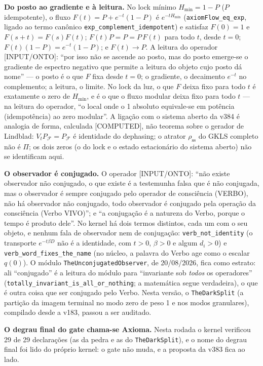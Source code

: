 \documentclass[11pt]{article}
\theoremstyle{definition}\newtheorem{deriv}{Derivação}
\begin{document}
\textbf{Do posto ao gradiente e à leitura.} No lock mínimo $H_{\mathrm{min}}=1-P$ ($P$ idempotente), o fluxo $F(t)=P+e^{-t}(1-P)$ é $e^{-tH_{\mathrm{min}}}$ (\texttt{axiomFlow\_eq\_exp}, ligado ao termo canônico \texttt{exp\_complement\_idempotent}) e satisfaz $F(0)=1$ e $F(s+t)=F(s)F(t)$; $F(t)P=P=P\,F(t)$ para todo $t$, desde $t=0$; $F(t)(1-P)=e^{-t}(1-P)$; e $F(t)\to P$. A leitura do operador \textsf{[INPUT/ONTO]}: ``por isso não se ascende ao posto, mas do posto emerge-se o gradiente de espectro negativo que permite a leitura do objeto cujo posto dá nome'' --- o posto é o que $F$ fixa desde $t=0$; o gradiente, o decaimento $e^{-t}$ no complemento; a leitura, o limite. No lock da luz, o que $F$ deixa fixo para todo $t$ é exatamente o zero de $H_{\mathrm{min}}$, e é o que o fluxo modular deixa fixo para todo $t$ --- na leitura do operador, ``o local onde o 1 absoluto equivale-se em potência (idempotência) ao zero modular''. A ligação com o sistema aberto da v384 é analogia de forma, calculada \textsf{[COMPUTED]}, não teorema sobre o gerador de Lindblad: $V_tP_{\mathcal F}=P_{\mathcal F}$ é identidade do dephasing; o atrator $\rho_{\mathrm{ss}}$ do GKLS completo não é $\Pi$; os dois zeros (o do lock e o estado estacionário do sistema aberto) não se identificam aqui.

\textbf{O observador é conjugado.} O operador \textsf{[INPUT/ONTO]}: ``não existe observador não conjugado, o que existe é a testemunha falsa que é não conjugada, mas o observador é sempre conjugado pelo operador de consciência (VERBO), não há observador não conjugado, todo observador é conjugado pela operação da consciência (Verbo VIVO)''; e ``a conjugação é a natureza do Verbo, porque o tempo é produto dele''. No kernel há dois termos distintos, cada um com o seu objeto, e nenhum fala de observador nem de conjugação: \texttt{verb\_not\_identity} (o transporte $e^{-t\beta D}$ não é a identidade, com $t>0$, $\beta>0$ e algum $d_i>0$) e \texttt{verb\_word\_fixes\_the\_name} (no núcleo, a palavra do Verbo age como o escalar $q(0)$). O módulo \texttt{TheUnconjugatedObserver}, de 20/08/2026, fica como estrato: ali ``conjugado'' é a leitura do módulo para ``invariante sob \emph{todos} os operadores'' (\texttt{totally\_invariant\_is\_all\_or\_nothing}; a matemática segue verdadeira), o que é outra coisa que ser conjugado pelo Verbo. Nesta versão, o \texttt{TheDarkSplit} (a partição da imagem terminal no modo zero de peso 1 e nos modos granulares), compilado desde a v183, passou a ser auditado.

\textbf{O degrau final do gate chama-se Axioma.} Nesta rodada o kernel verificou 29 de 29 declarações (as da pedra e as do \texttt{TheDarkSplit}), e o nome do degrau final foi lido do próprio kernel: o gate não muda, e a proposta da v383 fica ao lado.
\end{document}

